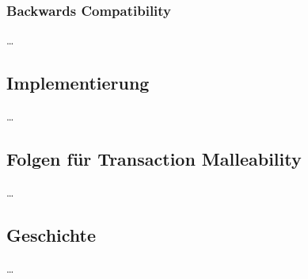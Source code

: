 \subsubsection{Backwards Compatibility}
\label{sec:SegWit:Idee:BackwardsCompatibility}

\dots

\subsection{Implementierung}
\label{sec:SegWit:Implementierung}

\dots

\subsection{Folgen für Transaction Malleability}
\label{sec:SegWit:Folgen}

\dots

\subsection{Geschichte}
\label{sec:SegWit:Geschichte}

\dots

